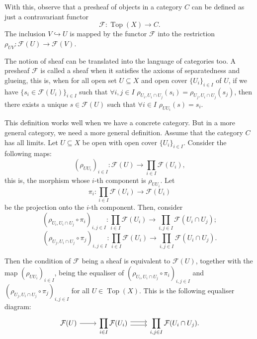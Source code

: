 \documentclass{report}
\DeclareMathOperator{\Top}{Top}
\theoremstyle{definition}
\begin{document}
With this, observe that a presheaf of objects in a category $C$ can be defined as just a contravariant functor
\[\mathcal{F}:\Top(X)\rightarrow C.\]
The inclusion $V\hookrightarrow U$ is mapped by the functor $\mathcal{F}$ into the restriction $\rho_{UV}:\mathcal{F}(U)\rightarrow\mathcal{F}(V)$.
\vspace{2mm}

The notion of sheaf can be translated into the language of categories too. A presheaf $\mathcal{F}$ is called a sheaf when it satisfies the axioms of separatedness and glueing, this is, when for all open set $U\subseteq X$ and open cover $\{U_i\}_{i\in I}$ of $U$, if we have $\{s_i\in\mathcal{F}(U_i)\}_{i\in I}$ such that $\forall i,j\in I$ $\rho_{U_i,U_i\cap U_j}(s_i)=\rho_{U_j,U_i\cap U_j}(s_j)$, then there exists a unique $s\in\mathcal{F}(U)$ such that $\forall i\in I$ $\rho_{UU_i}(s)=s_i$.

This definition works well when we have a concrete category. But in a more general category, we need a more general definition. Assume that the category $C$ has all limits. Let $U\subseteq X$ be open with open cover $\{U_i\}_{i\in I}$. Consider the following maps:
\[(\rho_{UU_i})_{i\in I}:\mathcal{F}(U)\longrightarrow\prod_{i\in I}\mathcal{F}(U_i),\]
this is, the morphism whose $i$-th component is $\rho_{UU_i}$.
Let
\[\pi_i:\prod_{i\in I}\mathcal{F}(U_i)\longrightarrow\mathcal{F}(U_i)\]
be the projection onto the $i$-th component. Then, consider
\[(\rho_{U_i,U_i\cap U_j}\circ\pi_i)_{i,j\in I}:\prod_{i\in I}\mathcal{F}(U_i)\longrightarrow\prod_{i,j\in I}\mathcal{F}(U_i\cap U_j);\]
\[(\rho_{U_j,U_i\cap U_j}\circ\pi_j)_{i,j\in I}:\prod_{i\in I}\mathcal{F}(U_i)\longrightarrow\prod_{i,j\in I}\mathcal{F}(U_i\cap U_j).\]

Then the condition of $\mathcal{F}$ being a sheaf is equivalent to $\mathcal{F}(U)$, together with the map $(\rho_{UU_i})_{i\in I}$, being the equaliser of $(\rho_{U_i,U_i\cap U_j}\circ\pi_i)_{i,j\in I}$ and $(\rho_{U_j,U_i\cap U_j}\circ\pi_j)_{i,j\in I}$ for all $U\in\Top(X)$. This is the following equaliser diagram:
\begin{equation}
\label{Equ:sheaf_equaliser}
\begin{tikzcd}
\mathcal{F}(U)\arrow[r]&\displaystyle{\prod_{i\in I}\mathcal{F}(U_i)}\arrow[r,shift left]\arrow[r,shift right]&\displaystyle{\prod_{i,j\in I}\mathcal{F}(U_i\cap U_j)}.
\end{tikzcd}
\end{equation}
\end{document}
